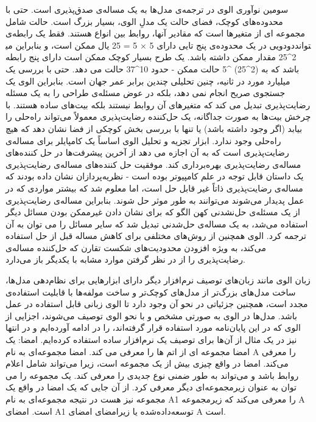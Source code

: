  سومین نوآوری الوی در ترجمه‌ی مدل‌ها به یک مساله‌ی صدق‌پذیری است. حتی با محدوده‌های کوچک، فضای حالت یک مدلِ الوی، بسیار بزرگ است. حالت شامل مجموعه ای از متغیرها است که مقادیر آنها، روابط بین انواع هستند. فقط یک رابطه‌ی دودویی در یک محدوده‌ی پنج تایی دارای 5 × 5 = 25 یال ممکن است، و بنابراین می‎تواند 2\textasciicircum 25 مقدار ممکن داشته باشد. یک طرح بسیار کوچک ممکن است دارای پنج رابطه باشد که به (2\textasciicircum25) \textasciicircum5 حالت ممکن - حدود 10\textasciicircum37 حالت می دهد. حتی با بررسی یک میلیارد مورد در ثانیه، چنین تحلیلی چندین برابر عمر جهان است. بنابراین الوی یک جستجوی صریح انجام نمی دهد، بلکه در عوض مسئله‌ی طراحی را به یک مسئله رضایت‌پذیری تبدیل می کند که متغیرهای آن روابط نیستند بلکه بیت‌های ساده هستند. با چرخش بیت‌ها به صورت جداگانه، یک حل‌کننده رضایت‌پذیری معمولاً می‌تواند راه‌حلی را بیابد (اگر وجود داشته باشد) یا تنها با بررسی بخش کوچکی از فضا نشان دهد که هیچ راه‌حلی وجود ندارد. ابزار تجزیه و تحلیل الوی اساساً یک کامپایلر برای مساله‌ی رضایت‌پذیری است که به آن اجازه می دهد از آخرین پیشرفت‌ها در حل کننده‌های مساله‌ی رضایت‌پذیری بهره‌برداری کند. موفقیت حل کننده‌های مساله‌ی رضایت‌پذیری یک داستان قابل توجه در علم کامپیوتر بوده است - نظریه‌پردازان نشان داده بودند که مساله‌ی رضایت‌پذیری ذاتاً غیر قابل حل است، اما معلوم شد که بیشتر مواردی که در عمل پدیدار می‌شوند می‌توانند به طور موثر حل شوند. بنابراین مساله‌ی رضایت‌پذیری از یک مسئله‌ی حل‌نشدنی کهن الگو که برای نشان دادن غیرممکن بودن مسائل دیگر استفاده می‌شد، به یک مساله‌ی حل‌شدنی تبدیل شد که سایر مسائل را می توان به آن ترجمه کرد. الوی همچنین از روش‌های مختلفی برای کاهش مساله‌ قبل از حل استفاده می‌کند، به ویژه افزودن محدودیت‌های شکست تقارن که حل‌کننده مساله‌ی رضایت‌پذیری را از در نظر گرفتن موارد مشابه با یکدیگر باز ‌می‌دارد.

زبان الوی مانند زبان‌های توصیف نرم‌افزار دیگر دارای ابزارهایی برای نظام‌دهی مدل‌ها، ساخت مدل‌های بزرگ‌تر از مدل‌های کوچک‌تر و ساخت مولفه‌ها با قابلیت استفاده‌ی مجدد است، همچنین جزئیاتی در نحو آن وجود دارد تا الوی زبانی قابل استفاده در عمل باشد. 
مدل‌ها در الوی به صورتی مشخص و با نحو الوی توصیف می‌شوند، اجزایی از الوی که در این پایان‌نامه مورد استفاده قرار گرفته‌اند، را در ادامه آورده‌ایم و در انتها نیز در یک مثال از آن‌ها برای توصیف یک نرم‌افزار ساده استفاده کرده‌ایم.
امضا: یک امضا مجموعه ای از اتم ها را معرفی می کند. امضا
مجموعه‌ای به نام A را معرفی می‌کند. امضا در واقع چیزی بیش از یک مجموعه است، زیرا می‌تواند شامل اعلام روابط باشد و می‌تواند به طور ضمنی نوع جدیدی را معرفی کند.
یک مجموعه را می توان به عنوان زیرمجموعه‌ای دیگر معرفی کرد. از آن جایی که یک امضا در واقع یک مجموعه نیز هست در نتیجه
مجموعه‌ای به نام A1 را معرفی می‌کند که زیرمجموعه A است. امضای A1 توسعه‌داده‌شده یا زیرامضای امضای A است.

